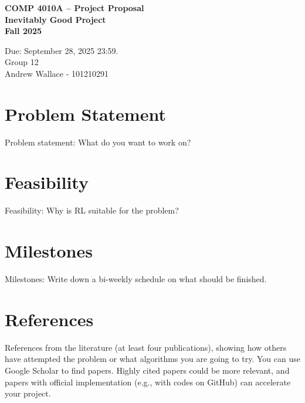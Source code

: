\documentclass[12pt]{article}
\begin{document}
 

\begin{center} \Large\bf
COMP 4010A -- Project Proposal\\
Inevitably Good Project \\
Fall 2025
\end{center} 

\begin{center}
Due: September 28, 2025 23:59. \\
Group 12 \\
Andrew Wallace - 101210291\\
\end{center}

\section{Problem Statement}
Problem statement: What do you want to work on?

\section{Feasibility}
Feasibility: Why is RL suitable for the problem?

\section{Milestones}
Milestones: Write down a bi-weekly schedule on what should be finished.

\vspace{0.5em}
\newpage 

\section{References}
References from the literature (at least four publications), showing how others have attempted the problem or what algorithms you are going to try. You can use Google Scholar to find papers. Highly cited papers could be more relevant, and papers with official implementation (e.g., with codes on GitHub) can accelerate your project.
\end{document}
